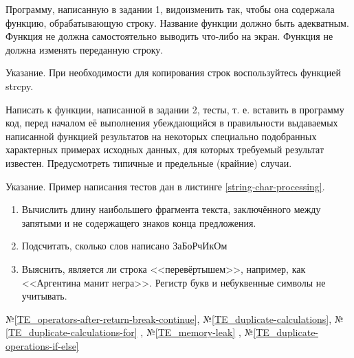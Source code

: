 \labtask

Программу, написанную в задании 1, видоизменить так, чтобы она содержала функцию, обрабатывающую строку.
Название функции должно быть адекватным.
Функция не должна самостоятельно выводить что-либо на экран.
Функция не должна изменять переданную строку.

Указание. При необходимости для копирования строк воспользуйтесь функцией strcpy.

\labtask

Написать к функции, написанной в задании 2, тесты,
т. е. вставить в программу код, перед началом её выполнения убеждающийся в правильности выдаваемых написанной функцией результатов
на некоторых специально подобранных характерных примерах исходных данных,
для которых требуемый результат известен.
Предусмотреть типичные и предельные (крайние) случаи.

Указание. Пример написания тестов дан в листинге \ref{string-char-processing}.

\reservedtasks

\begin{enumerate}
	\item
		Вычислить длину наибольшего фрагмента текста, заключённого между запятыми и не содержащего знаков конца предложения.
	\item
		Подсчитать, сколько слов написано ЗаБоРчИкОм
	\item
		Выяснить, является ли строка <<перевёртышем>>, например, как <<Аргентина манит негра>>.
		Регистр букв и небуквенные символы не учитывать.
\end{enumerate}

\typerrors
№\ref{TE_operators-after-return-break-continue},
№\ref{TE_duplicate-calculations},
№\ref{TE_duplicate-calculations-for}%
, №\ref{TE_memory-leak}%
, №\ref{TE_duplicate-operations-if-else}%

